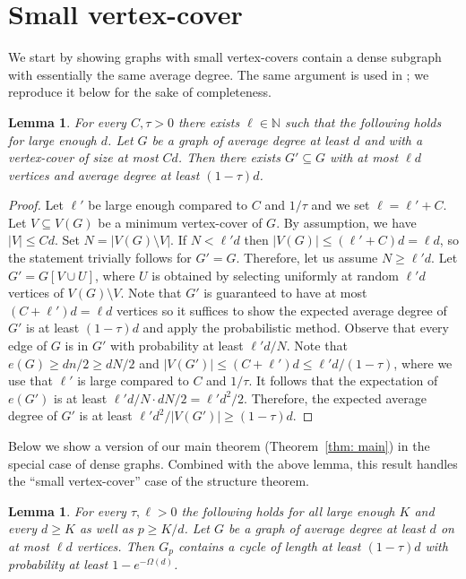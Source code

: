 \documentclass[10pt]{article}
\newtheorem{lemma}[theorem]{Lemma}
\theoremstyle{definition}
\let\leq\leqslant
\let\geq\geqslant
\begin{document}
\section{Small vertex-cover}
We start by showing graphs with small vertex-covers contain a dense subgraph with essentially the same average degree. The same argument is used in \cite{alexey}; we reproduce it below for the sake of completeness.
\begin{lemma}\label{lem: cover to dense}
    For every $C,\tau> 0$ there exists $\ell\in\mathbb{N}$ such that the following holds for large enough $d$. Let $G$ be a graph of average degree at least $d$ and with a vertex-cover of size at most $Cd$. Then there exists $G'\subseteq G$ with at most $\ell d$ vertices and average degree at least $(1-\tau)d$.
\end{lemma}
\begin{proof}
    Let $\ell'$ be large enough compared to $C$ and $1/\tau$ and we set $\ell=\ell'+C$. Let $V\subseteq V(G)$ be a minimum vertex-cover of $G$. By assumption, we have $|V|\leq Cd$. Set $N=|V(G)\setminus V|$. If $N<\ell'd$ then $|V(G)|\leq (\ell' +C)d= \ell d$, so the statement trivially follows for $G'=G$. Therefore, let us assume $N\geq \ell' d$. Let $G'=G[V\cup U]$, where $U$ is obtained by selecting uniformly at random $\ell' d$ vertices of $V(G)\setminus V$. Note that $G'$ is guaranteed to have at most $(C+\ell')d= \ell d$ vertices so it suffices to show the expected average degree of $G'$ is at least 
    $(1-\tau)d$ and apply the probabilistic method. Observe that every edge of $G$ is in $G'$ with probability at least $\ell' d/N$. Note that $e(G)\geq dn/2\geq dN/2$ and $|V(G')|\leq (C+\ell') d\leq \ell' d/(1-\tau)$, where we use that $\ell'$ is large compared to $C$ and $1/\tau$. It follows that the expectation of $e(G')$ is at least $\ell' d/N\cdot dN/2=\ell' d^2/2$. Therefore, the expected average degree of $G'$ is at least $\ell' d^2/|V(G')|\geq (1-\tau)d$.
\end{proof}
Below we show a version of our main theorem (Theorem~\ref{thm: main}) in the special case of dense graphs. Combined with the above lemma, this result handles the ``small vertex-cover'' case of the structure theorem.
\begin{lemma}\label{lem: dense case}
    For every $\tau,\ell>0$ the following holds for all large enough $K$ and every $d\geq K$ as well as $p\geq K/d$. Let $G$ be a graph of average degree at least $d$ on at most $\ell d$ vertices. Then $G_p$ contains a cycle of length at least $(1-\tau)d$ with probability at least $1-e^{-\Omega(d)}$.
\end{lemma}
\end{document}
